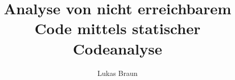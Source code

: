\documentclass[master,english,smartquotes]{hgbthesis}
\title{Analyse von nicht erreichbarem Code mittels statischer Codeanalyse}
\author{Lukas Braun}
\begin{document}

\frontmatter                    %

\maketitle
\tableofcontents




\mainmatter          %








\appendix                                            %


\MakeBibliography                        %




\end{document}
